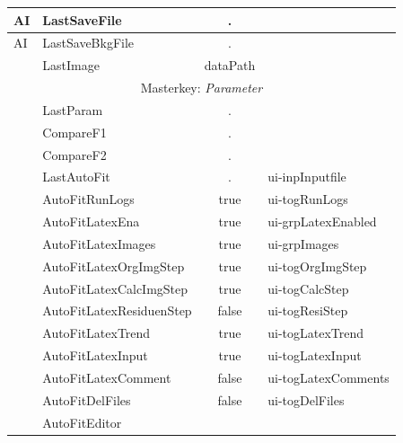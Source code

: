 \documentclass[11pt]{article} %
\begin{document}
\begin{longtable}{|l|l|c|l|}
AI & LastSaveFile & . &  \\ \hline
AI & LastSaveBkgFile & . &  \\ \hline
 & LastImage & dataPath &  \\ \hline
\multicolumn{4}{|c|}{Masterkey: {\it Parameter} }  \\ \hline
 & LastParam & . & \\ \hline
 & CompareF1 & . &  \\
 & CompareF2 & . &  \\ \hline
 & LastAutoFit & . & ui-inpInputfile \\ \hline
 & AutoFitRunLogs & true & ui-togRunLogs \\ \hline
 & AutoFitLatexEna & true & ui-grpLatexEnabled \\ \hline
 & AutoFitLatexImages & true & ui-grpImages \\ \hline
 & AutoFitLatexOrgImgStep & true & ui-togOrgImgStep \\ \hline
 & AutoFitLatexCalcImgStep & true & ui-togCalcStep \\ \hline
 & AutoFitLatexResiduenStep & false & ui-togResiStep \\ \hline
 & AutoFitLatexTrend & true & ui-togLatexTrend \\ \hline
 & AutoFitLatexInput & true & ui-togLatexInput \\ \hline
 & AutoFitLatexComment & false & ui-togLatexComments \\ \hline
 & AutoFitDelFiles & false & ui-togDelFiles \\ \hline
 & AutoFitEditor & &  \\ \hline

\end{longtable}
\end{document}

